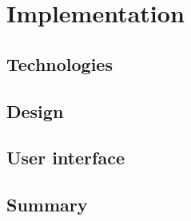 \chapter{Implementation}
\label{chap:implementation}

\section{Technologies}
\section{Design}
\section{User interface}
\section{Summary}
